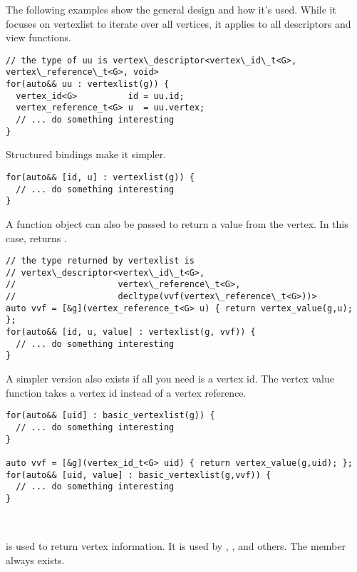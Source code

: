 The following examples show the general design and how it's used. While it focuses 
on vertexlist to iterate over all vertices, it applies to all descriptors and view functions.

\begin{lstlisting}
// the type of uu is vertex\_descriptor<vertex\_id\_t<G>, vertex\_reference\_t<G>, void>
for(auto&& uu : vertexlist(g)) {
  vertex_id<G>          id = uu.id;
  vertex_reference_t<G> u  = uu.vertex;
  // ... do something interesting
}
\end{lstlisting}

Structured bindings make it simpler.
\begin{lstlisting}
for(auto&& [id, u] : vertexlist(g)) {
  // ... do something interesting
}
\end{lstlisting}

A function object can also be passed to return a value from the vertex. In this case,  returns .
\begin{lstlisting}
// the type returned by vertexlist is 
// vertex\_descriptor<vertex\_id\_t<G>, 
//                    vertex\_reference\_t<G>, 
//                    decltype(vvf(vertex\_reference\_t<G>))>
auto vvf = [&g](vertex_reference_t<G> u) { return vertex_value(g,u); };
for(auto&& [id, u, value] : vertexlist(g, vvf)) {
  // ... do something interesting
}
\end{lstlisting}

A simpler version also exists if all you need is a vertex id. The vertex value function takes a vertex id
instead of a vertex reference.
\begin{lstlisting}
for(auto&& [uid] : basic_vertexlist(g)) {
  // ... do something interesting
}

auto vvf = [&g](vertex_id_t<G> uid) { return vertex_value(g,uid); };
for(auto&& [uid, value] : basic_vertexlist(g,vvf)) {
  // ... do something interesting
}
\end{lstlisting}

\subsection{}\label{vertex-view}\mbox{} \\
 is used to return vertex information. It is used by , , 
 and others. The  member always exists.

